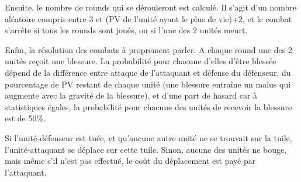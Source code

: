 Ensuite, le nombre de rounds qui se dérouleront est calculé. Il s'agit d'un nombre aléatoire compris entre 3 et (PV de l'unité ayant le plus de vie)+2, et le combat s'arrête si tous les rounds sont joués, ou si l'une des 2 unités meurt.\newline

Enfin, la résolution des combats à proprement parler. A chaque round une des 2 unités reçoit une blessure. La probabilité pour chacune d'elles d'être blessée dépend de la différence entre attaque de l'attaquant et défense du défenseur, du pourcentage de PV restant de chaque unité (une blessure entraîne un malus qui augmente avec la gravité de la blessure), et d'une part de hasard car à statistiques égales, la probabilité pour chacune des unités de recevoir la blessure est de 50\%.\newline

Si l'unité-défenseur est tuée, et qu'aucune autre unité ne se trouvait sur la tuile, l'unité-attaquant se déplace sur cette tuile. Sinon, aucune des unités ne bouge, mais même s'il n'est pas effectué, le coût du déplacement est payé par l'attaquant. 